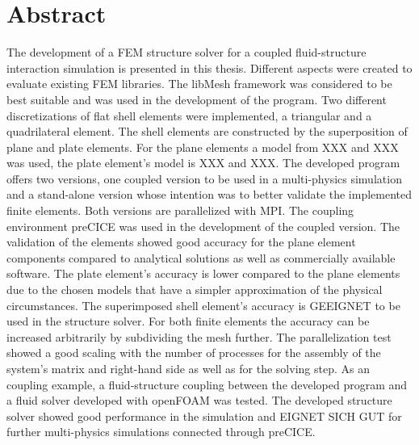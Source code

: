 \section*{Abstract}

The development of a FEM structure solver for a coupled fluid-structure interaction simulation is presented in this thesis. Different aspects were created to evaluate existing FEM libraries. The libMesh framework was considered to be best suitable and was used in the development of the program. Two different discretizations of flat shell elements were implemented, a triangular and a quadrilateral element. The shell elements are constructed by the superposition of plane and plate elements. For the plane elements a model from XXX and XXX was used, the plate element's model is XXX and XXX. The developed program offers two versions, one coupled version to be used in a multi-physics simulation and a stand-alone version whose intention was to better validate the implemented finite elements. Both versions are parallelized with MPI. The coupling environment preCICE was used in the development of the coupled version. The validation of the elements showed good accuracy for the plane element components compared to analytical solutions as well as commercially available software. The plate element's accuracy is lower compared to the plane elements due to the chosen models that have a simpler approximation of the physical circumstances. The superimposed shell element's accuracy is GEEIGNET to be used in the structure solver. For both finite elements the accuracy can be increased arbitrarily by subdividing the mesh further. The parallelization test showed a good scaling with the number of processes for the assembly of the system's matrix and right-hand side as well as for the solving step. As an coupling example, a fluid-structure coupling between the developed program and a fluid solver developed with openFOAM was tested. The developed structure solver showed good performance in the simulation and EIGNET SICH GUT for further multi-physics simulations connected through preCICE.
\newpage